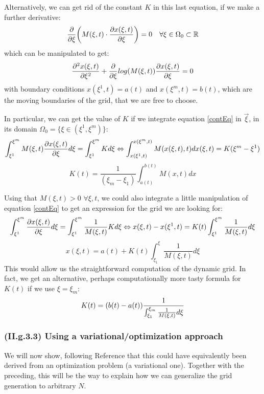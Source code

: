 \documentclass[11pt, a4paper]{article} %
\newcommand{\R}{\mathbb{R}} %
\begin{document}
Alternatively, we can get rid of the constant $K$ in this last equation, if we make a further derivative:
\begin{equation}\label{EL1D}
\pdv{}{\xi}\qty(M(\xi,t)\cdot \pdv{x(\xi,t)}{\xi})=0 \quad \forall \xi\in \Omega_0\subset \R
\end{equation}
which can be manipulated to get:
\begin{equation}
\pdv[2]{x(\xi,t)}{\xi}+\pdv{}{\xi}log(M(\xi,t))\pdv{x(\xi,t)}{\xi}=0
\end{equation}
with boundary conditions $x(\xi^1,t)=a(t)$ and $x(\xi^m,t)=b(t)$, which are the moving boundaries of the grid, that we are free to choose.

In particular, we can get the value of $K$ if we integrate equation \eqref{contEq} in $\vec{\xi}$, in its domain $\Omega_0=\{\xi\in(\xi^1,\xi^m)\}$:
\begin{equation}
\int^{\xi^m}_{\xi^1} M(\xi,t) \pdv{x(\xi,t)}{\xi} d\xi=\int^{\xi^m}_{\xi^1} K d \xi  \Leftrightarrow \int^{x(\xi^m,t)}_{x(\xi^1,t)} M(x(\xi,t),t) dx(\xi,t)=K(\xi^m-\xi^1)
\end{equation}
\begin{equation}
K(t)=\frac{1}{(\xi_m-\xi_1)}\int^{b(t)}_{a(t)} M(x,t) dx
\end{equation}

Using that $M(\xi,t)>0$ $\forall \xi,t$, we could also integrate a little manipulation of equation \eqref{contEq} to get an expression for the grid we are looking for:
\begin{equation}
\int^{\xi^m}_{\xi^1}  \pdv{x(\xi,t)}{\xi} d\xi=\int^{\xi^m}_{\xi^1} \frac{1}{M(\xi,t)} K d \xi  \Leftrightarrow x(\xi,t)-x(\xi^1,t) =K(t)\int^{\xi^m}_{\xi^1} \frac{1}{M(\xi,t)}  d \xi
\end{equation}
\begin{equation}
x(\xi,t)=a(t)+K(t)\int^\xi_{\xi_1} \frac{1}{M(\xi,t)}d\xi
\end{equation}
This would allow us the straightforward computation of the dynamic grid. In fact, we get an alternative, perhaps computationally more tasty formula for $K(t)$ if we use $\xi=\xi_m$:
\begin{equation}
K(t)=(b(t)-a(t))\frac{1}{\int^{\xi_m}_{\xi_1} \frac{1}{M(\xi,t)}d\xi}\vspace{-0.2cm}
\end{equation}

\subsubsection*{\bf (II.g.3.3) Using a variational/optimization approach}
We will now show, following Reference \cite{movingGrids} that this could have equivalently been derived from an optimization problem (a variational one). Together with the preceding, this will be the way to explain how we can generalize the grid generation to arbitrary $N$.
\end{document}
